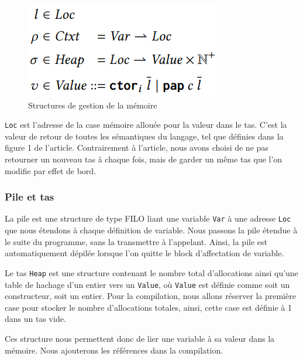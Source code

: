 \documentclass{rapportECL}
\begin{document}
\begin{figure}[hbt!]
	\centering
	\includegraphics[scale=0.80]{logos/figure_strutures_interpreteur.png}
	\caption{Structures de gestion de la mémoire} 
	\label{fig:memory}
\end{figure}
\FloatBarrier 


\verb|Loc| est l'adresse de la case mémoire allouée pour la valeur dans le tas. C'est la valeur de retour de toutes les sémantiques 
du langage, tel que définies dans la figure 1 de l'article\cite{ullrich_counting_2020}.
Contrairement à l'article, nous avons choisi de ne pas retourner un nouveau tas à chaque fois, mais de garder un même tas que 
l'on modifie par effet de bord.


\subsubsection{Pile et tas}

La pile est une structure de type FILO liant une variable \verb|Var| à une adresse \verb|Loc| que nous étendons à chaque définition de variable. Nous passons la pile étendue à le suite du programme, sans la transmettre à l'appelant. Ainsi, la pile est automatiquement dépilée lorsque l'on quitte le block d'affectation de variable.

Le tas \verb|Heap| est une structure contenant le nombre total d'allocations ainsi qu'une table de hachage d'un entier vers un \verb|Value|, où \verb|Value| est définie comme soit un constructeur, soit un entier.
Pour la compilation, nous allons réserver la première case pour stocker le nombre d'allocations totales, ainsi, cette case est définie à 1 dans un tas vide.

Ces structure nous permettent donc de lier une variable à sa valeur dans la mémoire. Nous ajouterons les références dans la compilation.

\end{document}
